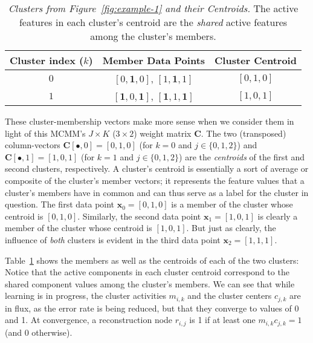 { \begin{table}[b]
\begin{mdframed}
\centering
\setlength{\extrarowheight}{8pt}
\begin{tabular}{ccc}
\toprule
Cluster index ($k$) & Member Data Points & Cluster Centroid \\ \midrule
 $0$ &  $[0,\mathbf{1},0]$, $[1,\mathbf{1},1]$ & $[0,1,0]$\\ 
 $1$  & $[\mathbf{1},0,\mathbf{1}]$, $[\mathbf{1},1,\mathbf{1}]$ & $[1,0,1]$\\
 \bottomrule
 \end{tabular}
\caption{\emph{Clusters from Figure~\ref{fig:example-1} and their Centroids.} The active features in each cluster's centroid are the \emph{shared} active features among the cluster's members.}
\label{tab:cl-members}
\end{mdframed}
\end{table}

These cluster-membership vectors make more sense when we consider them in light of this MCMM's $J \times K$ ($3 \times 2$) weight matrix $\textbf{C}$. The two (transposed) column-vectors 
$\textbf{C}[\bullet,0] = [0,1,0]$ (for $k = 0$ and $j \in \{ 0,1,2\}$) and $\textbf{C}[\bullet,1]  = [1,0,1]$ (for $k = 1$ and $j \in \{ 0,1,2\}$)
are the \emph{centroids} of the first and second clusters, respectively. A cluster's centroid is essentially a  sort of average or composite of the cluster's member vectors; it represents the feature values that a cluster's members have in common and can thus serve as a label for the cluster in question. The first data point $\textbf{x}_0 = [0,1,0]$ is a member of the cluster whose centroid is $[0,1,0]$. Similarly, the second data point $\textbf{x}_1 = [1,0,1]$ is clearly a member of the cluster whose centroid is $[1,0,1]$. But just as clearly, the influence of \emph{both} clusters is evident in the third data point $\textbf{x}_2 = [1,1,1]$.

Table~\ref{tab:cl-members} shows the members as well as the centroids of each of the two clusters: Notice that the active components in each cluster centroid correspond to the shared component values among the cluster's members.
We can see that while learning is in progress, the cluster activities
$m_{i,k}$ and the cluster centers $c_{j,k}$ are in flux, as the
error rate is being reduced, but that they converge to values of 0 and
1.  At convergence, a reconstruction node $r_{i,j}$ is 1 if at least one
$m_{i,k}c_{j,k} = 1$ (and $0$ otherwise).

}
